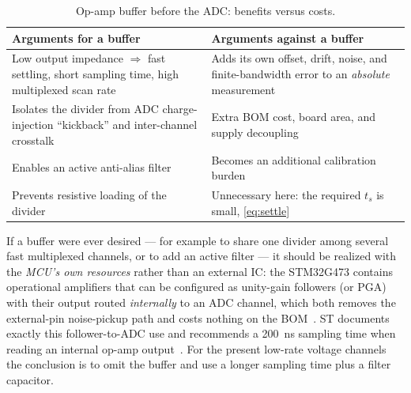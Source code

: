 \documentclass[journal,onecolumn,11pt]{IEEEtran}
\begin{document}
\begin{table}[!t]
\centering
\caption{Op-amp buffer before the ADC: benefits versus costs.}
\label{tab:buffer}
\renewcommand{\arraystretch}{1.2}
\begin{tabularx}{\textwidth}{@{}L L@{}}
\toprule
\textbf{Arguments for a buffer} & \textbf{Arguments against a buffer}\\
\midrule
Low output impedance $\Rightarrow$ fast settling, short sampling time, high multiplexed scan rate &
Adds its own offset, drift, noise, and finite-bandwidth error to an \emph{absolute} measurement\\
Isolates the divider from ADC charge-injection ``kickback'' and inter-channel crosstalk &
Extra BOM cost, board area, and supply decoupling\\
Enables an active anti-alias filter &
Becomes an additional calibration burden\\
Prevents resistive loading of the divider &
Unnecessary here: the required $t_s$ is small, \eqref{eq:settle}\\
\bottomrule
\end{tabularx}
\end{table}

If a buffer were ever desired --- for example to share one divider among several fast multiplexed
channels, or to add an active filter --- it should be realized with the \emph{MCU's own resources}
rather than an external IC: the STM32G473 contains operational amplifiers that can be configured as
unity-gain followers (or PGA) with their output routed \emph{internally} to an ADC channel, which
both removes the external-pin noise-pickup path and costs nothing on the BOM~\cite{an5306,stm32g473ds}.
ST documents exactly this follower-to-ADC use and recommends a \SI{200}{\nano\second} sampling time
when reading an internal op-amp output~\cite{an5346,an5306}. For the present low-rate voltage
channels the conclusion is to omit the buffer and use a longer sampling time plus a filter capacitor.
\end{document}
